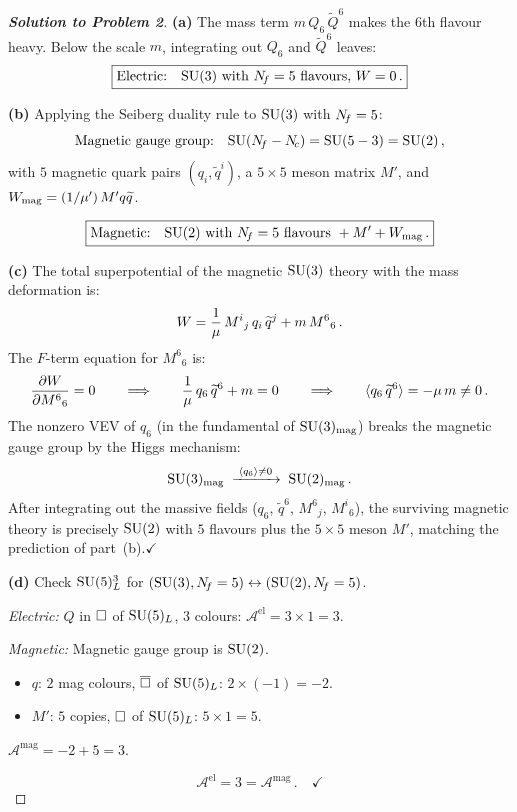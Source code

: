 \documentclass[11pt,a4paper]{article}
\begin{document}
\begin{proof}[\textbf{Solution to Problem 2}]

\textbf{(a)} The mass term $m\, Q_6\,\widetilde{Q}^6$ makes the 6th
flavour heavy.  Below the scale $m$, integrating out $Q_6$ and
$\widetilde{Q}^6$ leaves:
\[
  \boxed{\text{Electric:}\quad \mathrm{SU}(3) \text{ with } N_{\!f} = 5
  \text{ flavours, } W = 0\,.}
\]

\textbf{(b)} Applying the Seiberg duality rule to
$\mathrm{SU}(3)$ with $N_{\!f} = 5$:
\[
  \text{Magnetic gauge group:}\quad \mathrm{SU}(N_{\!f} - N_{\!c}) = \mathrm{SU}(5 - 3) = \mathrm{SU}(2)\,,
\]
with $5$ magnetic quark pairs $(q_i, \widetilde{q}^i)$, a $5 \times 5$
meson matrix $M'$, and $W_{\mathrm{mag}} = (1/\mu')\, M' q \widetilde{q}$.

\[
  \boxed{\text{Magnetic:}\quad \mathrm{SU}(2) \text{ with } N_{\!f} = 5
  \text{ flavours } + M' + W_{\mathrm{mag}}\,.}
\]

\textbf{(c)} The total superpotential of the magnetic $\mathrm{SU}(3)$ theory
with the mass deformation is:
\[
  W = \frac{1}{\mu}\, M^i{}_j\, q_i\, \widetilde{q}^j + m\, M^6{}_6\,.
\]
The $F$-term equation for $M^6{}_6$ is:
\[
  \frac{\partial W}{\partial M^6{}_6} = 0
  \qquad\Longrightarrow\qquad
  \frac{1}{\mu}\, q_6\, \widetilde{q}^6 + m = 0
  \qquad\Longrightarrow\qquad
  \langle q_6\, \widetilde{q}^6\rangle = -\mu\, m \neq 0\,.
\]
The nonzero VEV of $q_6$ (in the fundamental of $\mathrm{SU}(3)_{\mathrm{mag}}$)
breaks the magnetic gauge group by the Higgs mechanism:
\[
  \mathrm{SU}(3)_{\mathrm{mag}}
  \;\xrightarrow{\;\langle q_6 \rangle \neq 0\;}
  \;\mathrm{SU}(2)_{\mathrm{mag}}\,.
\]
After integrating out the massive fields ($q_6$, $\widetilde{q}^6$,
$M^6{}_j$, $M^i{}_6$), the surviving magnetic theory is precisely
$\mathrm{SU}(2)$ with $5$ flavours plus the $5 \times 5$ meson $M'$, matching
the prediction of part~(b).\quad$\checkmark$

\textbf{(d)} Check $\mathrm{SU}(5)_L^3$ for $(\mathrm{SU}(3), N_{\!f} = 5) \leftrightarrow
(\mathrm{SU}(2), N_{\!f} = 5)$.

\textit{Electric:} $Q$ in $\square$ of $\mathrm{SU}(5)_L$, $3$ colours:
$\mathcal{A}^{\mathrm{el}} = 3 \times 1 = 3$.

\textit{Magnetic:} Magnetic gauge group is $\mathrm{SU}(2)$.
\begin{itemize}
  \item $q$: $2$ mag colours, $\overline{\square}$ of $\mathrm{SU}(5)_L$:
    $2 \times (-1) = -2$.
  \item $M'$: $5$ copies, $\square$ of $\mathrm{SU}(5)_L$:
    $5 \times 1 = 5$.
\end{itemize}
$\mathcal{A}^{\mathrm{mag}} = -2 + 5 = 3$.

\[
  \boxed{\mathcal{A}^{\mathrm{el}} = 3 = \mathcal{A}^{\mathrm{mag}}}\,.
  \quad\checkmark
\]
\end{proof}
\end{document}
